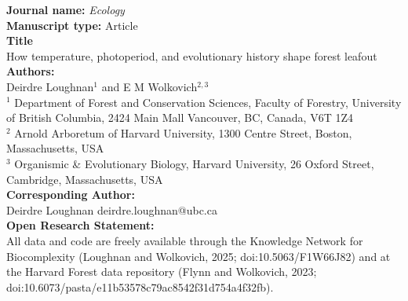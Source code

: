 \documentclass{article}
\begin{document}
\textbf{Journal name:}  \emph{Ecology}\\

\textbf{Manuscript type:} Article\\

\textbf{Title}\\
How temperature, photoperiod, and evolutionary history shape forest leafout\\

\textbf{Authors:}\\
Deirdre Loughnan$^{1}$ and E M Wolkovich$^{2,3}$\\


$^1$ Department of Forest and Conservation Sciences, Faculty of Forestry, University of British Columbia, 2424 Main Mall
Vancouver, BC, Canada, V6T 1Z4 \\

$^2$ Arnold Arboretum of Harvard University, 1300 Centre Street, Boston, Massachusetts, USA\\
 
$^3$ Organismic \& Evolutionary Biology, Harvard University, 26 Oxford Street, Cambridge, Massachusetts, USA\\

\textbf{Corresponding Author: }\\
Deirdre Loughnan deirdre.loughnan@ubc.ca \\

\textbf{Open Research Statement:}\\
All data and code are freely available through the Knowledge Network for Biocomplexity (Loughnan and Wolkovich, 2025; doi:10.5063/F1W66J82) and at the Harvard Forest data repository (Flynn and Wolkovich, 2023; doi:10.6073/pasta/e11b53578c79ac8542f31d754a4f32fb).\\

% 
% 
\end{document}
